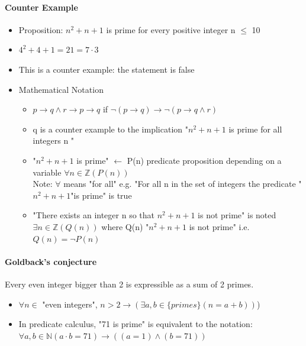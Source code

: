 \documentclass[9pt, letterpaper, oneside]{article}
\begin{document}
\paragraph{Counter Example}
	\begin{itemize}
		\item Proposition: $n^2 + n + 1$ is prime for every positive integer n $\leq$ 10
		\item $4^2 + 4 + 1 = 21 = 7 \cdot 3$
		\item This is a counter example: the statement is false
		\item Mathematical Notation
		\begin{itemize}
		\item $p \to q \wedge r \to p \to q$ if $\neg(p \to q) \to \neg(p \to q \wedge r)$ 
		\item q is a counter example to the implication "$n^2 + n + 1$ is prime for all integers n " 			\item "$n^2+ n + 1$ is prime" $\leftarrow$ P(n) predicate proposition depending on a variable
		$\forall n \in \mathbb{Z}(P(n))$\\
		Note: $\forall$  means "for all" e.g. "For all n in the set of integers the predicate "$n^2 + n + 1$"is prime" is true
		\item "There exists an integer n so that $n^2 + n + 1$ is not prime" is noted $\exists n \in \mathbb{Z}(Q(n))$ where Q(n) "$n^2 + n + 1$ is not prime" i.e. $Q(n) = \neg P(n)$
		\end{itemize}
\end{itemize}

\paragraph{Goldback's conjecture}
Every even integer bigger than 2 is expressible as a sum of 2 primes.
\begin{itemize}
\item $\forall n \in$ "even integers", $n > 2 \to (\exists a, b \in \{primes\} (n = a + b))$)
\item
In predicate calculus, "71 is prime" is equivalent to the notation: \\ $\forall a, b \in \mathbb{N} ( a \cdot b = 71) \to ((a = 1) \wedge (b=71))$
\end{itemize}
\end{document}
